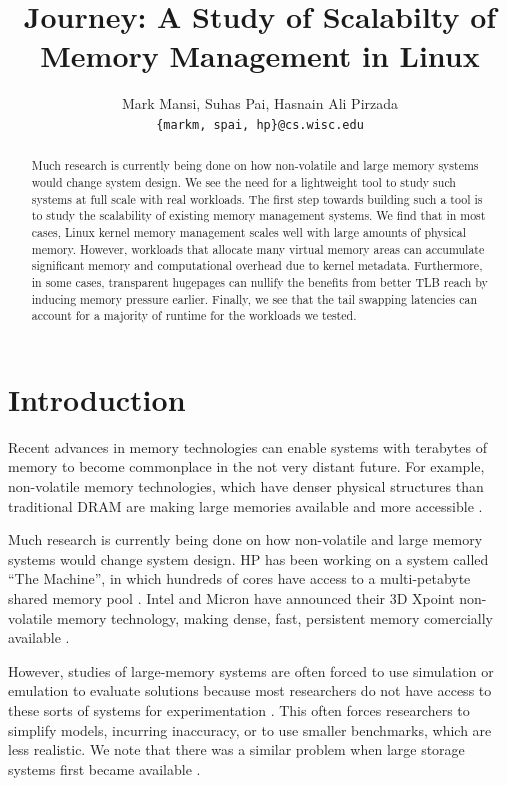 \documentclass[twocolumn,11pt]{article}
\title{Journey: A Study of Scalabilty of Memory Management in Linux}
\author{Mark Mansi, Suhas Pai, Hasnain Ali Pirzada\\\texttt{\{markm, spai, hp\}@cs.wisc.edu}}
\date{}
\begin{document}
\maketitle

\begin{abstract}
    \small 

Much research is currently being done on how non-volatile and large
memory systems would change system design.  We see the need for a lightweight
tool to study such systems at full scale with real workloads. The first step
towards building such a tool is to study the scalability of existing memory
management systems. We find that in most cases, Linux kernel memory management
scales well with large amounts of physical memory. However, workloads that
allocate many virtual memory areas can accumulate significant memory and
computational overhead due to kernel metadata. Furthermore, in some cases, 
transparent hugepages can nullify the benefits from better TLB
reach by inducing memory pressure earlier. Finally, we see that the tail
swapping latencies can account for a majority of runtime for the
workloads we tested.

\end{abstract}

\section{Introduction}

Recent advances in memory technologies can enable systems with terabytes of
memory to become commonplace in the not very distant future. For example,
non-volatile memory technologies, which have denser physical structures than
traditional DRAM are making large memories available and more accessible
\cite{xpoint}.

Much research is currently being done on how non-volatile and large
memory systems would change system design. HP has been working on a system
called ``The Machine'', in which hundreds of cores have access to a
multi-petabyte shared memory pool \cite{hp_machine}. Intel and
Micron have announced their 3D Xpoint non-volatile memory technology, making
dense, fast, persistent memory comercially available \cite{xpoint}.

However, studies of large-memory systems are often forced to use simulation or
emulation to evaluate solutions because most researchers do not have access to
these sorts of systems for experimentation \cite{quartz}. This often
forces researchers to simplify models, incurring inaccuracy, or to use smaller
benchmarks, which are less realistic. We note that there was a similar problem
when large storage systems first became available \cite{david, exalt}.
\end{document}
